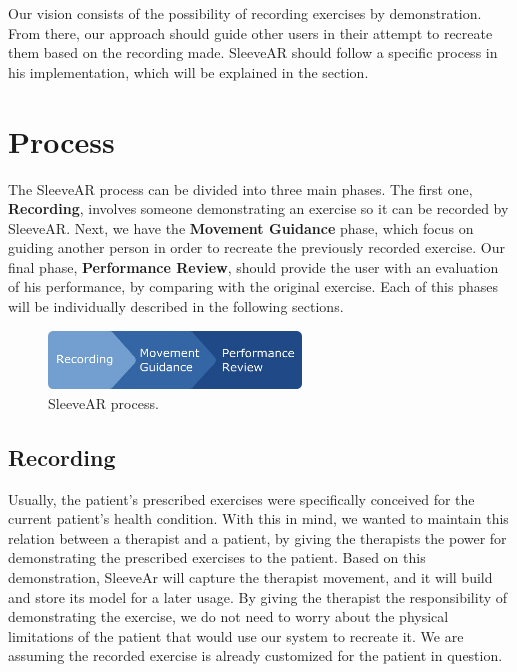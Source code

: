Our vision consists of the possibility of recording exercises by demonstration. From there, our approach should guide other users in their attempt to recreate them based on the recording made.
SleeveAR should follow a specific process in his implementation, which will be explained in the section.

\section{Process}

The SleeveAR process can be divided into three main phases. 
The first one, \textbf{Recording}, involves someone demonstrating an exercise so it can be recorded by SleeveAR. 
Next, we have the \textbf{Movement Guidance} phase, which focus on guiding another person in order to recreate the previously recorded exercise.
Our final phase, \textbf{Performance Review}, should provide the user with an evaluation of his performance, by comparing with the original exercise.
Each of this phases will be individually described in the following sections.

\begin{figure}[!h]
    \begin{center}
        \includegraphics[width=0.6\textwidth]{imgs/approach/sleevear-progress}
    \end{center}
    \caption{SleeveAR process.}
    \label{fig:sleevear-progress}
\end{figure}

\subsection{Recording}

Usually, the patient's prescribed exercises were specifically conceived for the current patient's health condition. 
With this in mind, we wanted to maintain this relation between a therapist and a patient, by giving the therapists the power for demonstrating the prescribed exercises to the patient. 
Based on this demonstration, SleeveAr will capture the therapist movement, and it will build and store its model for a later usage.
By giving the therapist the responsibility of demonstrating the exercise, we do not need to worry about the physical limitations of the patient that would use our system to recreate it. 
We are assuming the recorded exercise is already customized for the patient in question.

